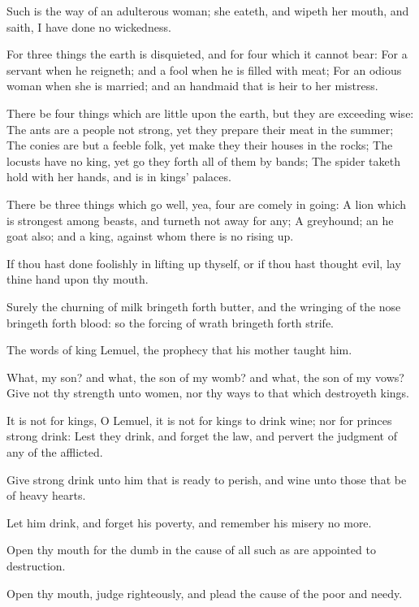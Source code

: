 \Verse Such is the way of an adulterous woman; she eateth, and wipeth her mouth, and saith, I have done no wickedness.

\Verse For three things the earth is disquieted, and for four which it cannot bear: \Verse For a servant when he reigneth; and a fool when he is filled with meat; \Verse For an odious woman when she is married; and an handmaid that is heir to her mistress.

\Verse There be four things which are little upon the earth, but they are exceeding wise: \Verse The ants are a people not strong, yet they prepare their meat in the summer; \Verse The conies are but a feeble folk, yet make they their houses in the rocks; \Verse The locusts have no king, yet go they forth all of them by bands; \Verse The spider taketh hold with her hands, and is in kings' palaces.

\Verse There be three things which go well, yea, four are comely in going: \Verse A lion which is strongest among beasts, and turneth not away for any; \Verse A greyhound; an he goat also; and a king, against whom there is no rising up.

\Verse If thou hast done foolishly in lifting up thyself, or if thou hast thought evil, lay thine hand upon thy mouth.

\Verse Surely the churning of milk bringeth forth butter, and the wringing of the nose bringeth forth blood: so the forcing of wrath bringeth forth strife.


\Chapter
\Verse The words of king Lemuel, the prophecy that his mother taught him.

\Verse What, my son? and what, the son of my womb? and what, the son of my vows?  \Verse Give not thy strength unto women, nor thy ways to that which destroyeth kings.

\Verse It is not for kings, O Lemuel, it is not for kings to drink wine; nor for princes strong drink: \Verse Lest they drink, and forget the law, and pervert the judgment of any of the afflicted.

\Verse Give strong drink unto him that is ready to perish, and wine unto those that be of heavy hearts.

\Verse Let him drink, and forget his poverty, and remember his misery no more.

\Verse Open thy mouth for the dumb in the cause of all such as are appointed to destruction.

\Verse Open thy mouth, judge righteously, and plead the cause of the poor and needy.

